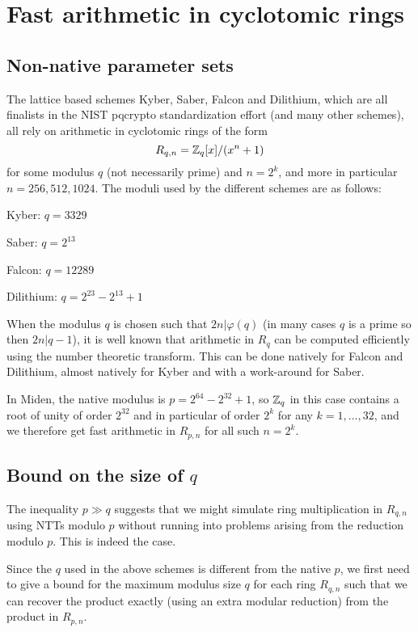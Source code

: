 \section{Fast arithmetic in cyclotomic rings}
\label{section:arithmetic}

\subsection{Non-native parameter sets}

The lattice based schemes Kyber, Saber, Falcon and Dilithium, which are all finalists in the NIST pqcrypto standardization
effort (and many other schemes), all rely on arithmetic in cyclotomic rings of the form
\[  R_{q,n} = \mathbb{Z}_q[x]/(x^n + 1)    \]
for some modulus $q$ (not necessarily prime) and $n = 2^k$, and more in particular $n = 256, 512, 1024$.
The moduli used by the different schemes are as follows:
\bit
\item Kyber: $q = 3329$
\item Saber: $q = 2^{13}$
\item Falcon: $q = 12289$
\item Dilithium: $q = 2^{23} - 2^{13} + 1$
\eit

When the modulus $q$ is chosen such that $2n | \varphi(q)$ (in many cases $q$ is a prime so then $2n | q-1$), 
it is well known that arithmetic in $R_q$ can be computed efficiently using the number theoretic transform.
This can be done natively for Falcon and Dilithium, almost natively for Kyber and with a work-around for Saber.

In Miden, the native modulus is $p = 2^{64} - 2^{32} + 1$, so $\mathbb{Z}_q$ in this case contains a root of unity 
of order $2^{32}$ and in particular of order $2^k$ for any $k = 1, \ldots, 32$, and we therefore get fast
arithmetic in $R_{p,n}$ for all such $n = 2^k$.

\subsection{Bound on the size of $q$}

The inequality $p \gg q$ suggests that we might simulate ring multiplication in $R_{q,n}$ using NTTs modulo $p$ without running into problems arising from the reduction modulo $p$. This is indeed the case.

Since the $q$ used in the above schemes is different from the native $p$, we first need to give a bound for
the maximum modulus size $q$ for each ring $R_{q,n}$ such that we can recover the product exactly (using 
an extra modular reduction) from the product in $R_{p,n}$.

